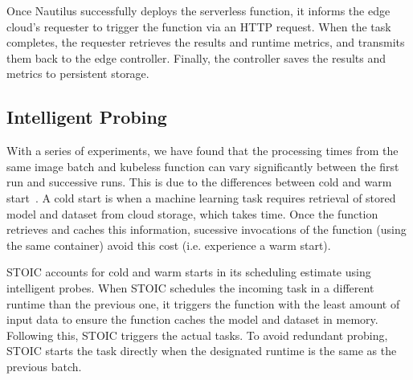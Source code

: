 Once Nautilus successfully deploys the serverless function, it informs 
the edge cloud's requester to trigger the function via an HTTP request. 
When the task completes, the requester retrieves the results and 
runtime metrics, and transmits them back to the edge controller. Finally,
the controller saves the results and metrics to persistent storage. 
 
 \subsection{Intelligent Probing}
 With a series of experiments, we have found that the processing times from the same image batch and kubeless function can vary significantly between the
first run and successive runs. This is due to the differences
between cold and warm start~\cite{ref:coldstart}.  A cold start is
when a machine learning task requires retrieval of stored model and 
dataset from cloud storage, which takes time. Once the function 
retrieves and caches this information, sucessive invocations of the
function (using the same container) avoid this cost (i.e. experience
a warm start). 

STOIC accounts for cold and warm starts in its scheduling
estimate using intelligent probes.  
When STOIC schedules the incoming task in a different runtime than the previous one, it triggers the function with the least amount of input data to ensure the function caches the model and dataset in memory. Following this, STOIC 
triggers the actual tasks. To avoid redundant probing, STOIC starts the task directly when the designated runtime is the same as the previous batch.
